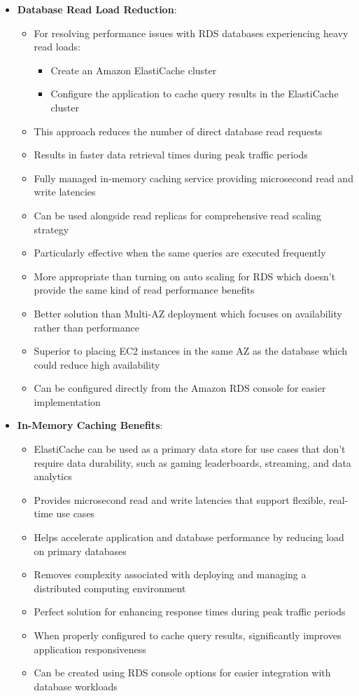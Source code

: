 \documentclass[11pt,a4paper]{report}
\begin{document}
\begin{itemize}
\begin{itemize}
\end{itemize}
  \item \textbf{Database Read Load Reduction}:
\begin{itemize}
  \item For resolving performance issues with RDS databases experiencing heavy read loads:
\begin{itemize}
  \item Create an Amazon ElastiCache cluster
  \item Configure the application to cache query results in the ElastiCache cluster
\end{itemize}
  \item This approach reduces the number of direct database read requests
  \item Results in faster data retrieval times during peak traffic periods
  \item Fully managed in-memory caching service providing microsecond read and write latencies
  \item Can be used alongside read replicas for comprehensive read scaling strategy
  \item Particularly effective when the same queries are executed frequently
  \item More appropriate than turning on auto scaling for RDS which doesn't provide the same kind of read performance benefits
  \item Better solution than Multi-AZ deployment which focuses on availability rather than performance
  \item Superior to placing EC2 instances in the same AZ as the database which could reduce high availability
  \item Can be configured directly from the Amazon RDS console for easier implementation
\end{itemize}
  \item \textbf{In-Memory Caching Benefits}:
\begin{itemize}
  \item ElastiCache can be used as a primary data store for use cases that don't require data durability, such as gaming leaderboards, streaming, and data analytics
  \item Provides microsecond read and write latencies that support flexible, real-time use cases
  \item Helps accelerate application and database performance by reducing load on primary databases
  \item Removes complexity associated with deploying and managing a distributed computing environment
  \item Perfect solution for enhancing response times during peak traffic periods
  \item When properly configured to cache query results, significantly improves application responsiveness
  \item Can be created using RDS console options for easier integration with database workloads
\end{itemize}
\end{itemize}
\end{document}
